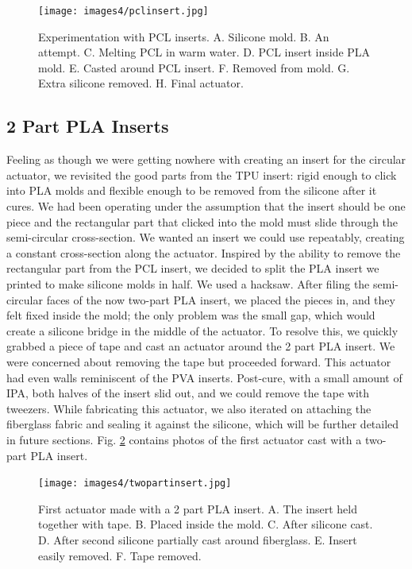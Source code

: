\begin{figure}[ht]
    \centering
    \texttt{[image: images4/pclinsert.jpg]}
    \caption{Experimentation with PCL inserts. A. Silicone mold. B. An attempt. C. Melting PCL in warm water. D. PCL insert inside PLA mold. E. Casted around PCL insert. F. Removed from mold. G. Extra silicone removed. H. Final actuator.}
    \label{fig:pclinsert}
\end{figure}

\clearpage
\subsection{2 Part PLA Inserts}
Feeling as though we were getting nowhere with creating an insert for the circular actuator, we revisited the good parts from the TPU insert: rigid enough to click into PLA molds and flexible enough to be removed from the silicone after it cures. We had been operating under the assumption that the insert should be one piece and the rectangular part that clicked into the mold must slide through the semi-circular cross-section. We wanted an insert we could use repeatably, creating a constant cross-section along the actuator. Inspired by the ability to remove the rectangular part from the PCL insert, we decided to split the PLA insert we printed to make silicone molds in half. We used a hacksaw. After filing the semi-circular faces of the now two-part PLA insert, we placed the pieces in, and they felt fixed inside the mold; the only problem was the small gap, which would create a silicone bridge in the middle of the actuator. To resolve this, we quickly grabbed a piece of tape and cast an actuator around the 2 part PLA insert. We were concerned about removing the tape but proceeded forward. This actuator had even walls reminiscent of the PVA inserts. Post-cure, with a small amount of IPA, both halves of the insert slid out, and we could remove the tape with tweezers. While fabricating this actuator, we also iterated on attaching the fiberglass fabric and sealing it against the silicone, which will be further detailed in future sections. Fig. \ref{fig:twopartinsert} contains photos of the first actuator cast with a two-part PLA insert. 

\begin{figure}[ht]
    \centering
    \texttt{[image: images4/twopartinsert.jpg]}
    \caption{First actuator made with a 2 part PLA insert. A. The insert held together with tape. B. Placed inside the mold. C. After silicone cast. D. After second silicone partially cast around fiberglass. E. Insert easily removed. F. Tape removed.}
    \label{fig:twopartinsert}
\end{figure}

